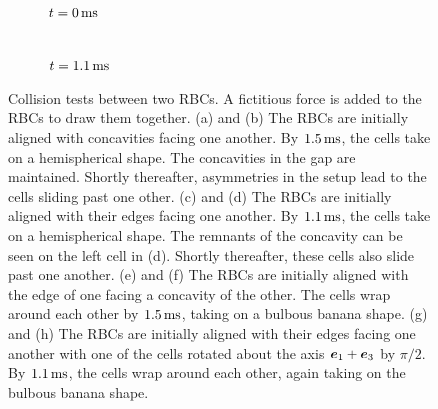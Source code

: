 \begin{figure}[tb]
\begin{subfigure}[t]{.25\textwidth}
        $t = 0\ms$
    \end{subfigure}%
    \begin{subfigure}[t]{.25\textwidth}
        \centering
         \\
        $t = 1.1\ms$
    \end{subfigure}
    \caption{%
Collision tests between two RBCs. A fictitious force is added to the RBCs to draw them together. (a) and (b) The
RBCs are initially aligned with concavities facing one another. By $1.5\ms$, the cells take on a hemispherical
shape. The concavities in the gap are maintained. Shortly thereafter, asymmetries in the setup lead to the cells
sliding past one other. (c) and (d) The RBCs are initially aligned with their edges facing one another. By
$1.1\ms$, the cells take on a hemispherical shape. The remnants of the concavity can be seen on the left cell in
(d). Shortly thereafter, these cells also slide past one another. (e) and (f) The RBCs are initially aligned with
the edge of one facing a concavity of the other. The cells wrap around each other by $1.5\ms$, taking on a bulbous
banana shape. (g) and (h) The RBCs are initially aligned with their edges facing one another with one of the cells
rotated about the axis $\boldsymbol{e}_1+\boldsymbol{e}_3$ by $\pi/2$. By $1.1\ms$, the cells wrap around each other, again taking on the
bulbous banana shape.
    }%
    \label{fig:collisions}
\end{figure}

